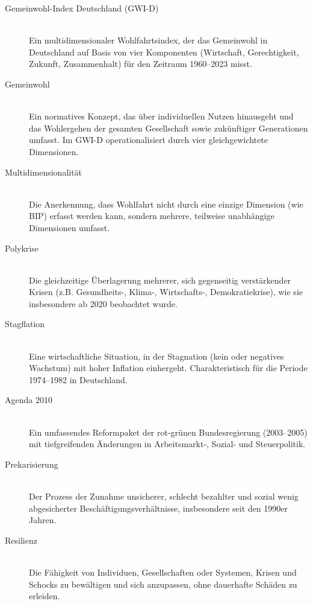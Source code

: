 \begin{description}
    \item[Gemeinwohl-Index Deutschland (GWI-D)] \hfill \\
    Ein multidimensionaler Wohlfahrtsindex, der das Gemeinwohl in Deutschland auf Basis von vier Komponenten (Wirtschaft, Gerechtigkeit, Zukunft, Zusammenhalt) für den Zeitraum 1960–2023 misst.
    
    \item[Gemeinwohl] \hfill \\
    Ein normatives Konzept, das über individuellen Nutzen hinausgeht und das Wohlergehen der gesamten Gesellschaft sowie zukünftiger Generationen umfasst. Im GWI-D operationalisiert durch vier gleichgewichtete Dimensionen.
    
    \item[Multidimensionalität] \hfill \\
    Die Anerkennung, dass Wohlfahrt nicht durch eine einzige Dimension (wie BIP) erfasst werden kann, sondern mehrere, teilweise unabhängige Dimensionen umfasst.
    
    \item[Polykrise] \hfill \\
    Die gleichzeitige Überlagerung mehrerer, sich gegenseitig verstärkender Krisen (z.B. Gesundheits-, Klima-, Wirtschafts-, Demokratiekrise), wie sie insbesondere ab 2020 beobachtet wurde.
    
    \item[Stagflation] \hfill \\
    Eine wirtschaftliche Situation, in der Stagnation (kein oder negatives Wachstum) mit hoher Inflation einhergeht. Charakteristisch für die Periode 1974–1982 in Deutschland.
    
    \item[Agenda 2010] \hfill \\
    Ein umfassendes Reformpaket der rot-grünen Bundesregierung (2003–2005) mit tiefgreifenden Änderungen in Arbeitsmarkt-, Sozial- und Steuerpolitik.
    
    \item[Prekarisierung] \hfill \\
    Der Prozess der Zunahme unsicherer, schlecht bezahlter und sozial wenig abgesicherter Beschäftigungsverhältnisse, insbesondere seit den 1990er Jahren.
    
    \item[Resilienz] \hfill \\
    Die Fähigkeit von Individuen, Gesellschaften oder Systemen, Krisen und Schocks zu bewältigen und sich anzupassen, ohne dauerhafte Schäden zu erleiden.
    

\end{description}
